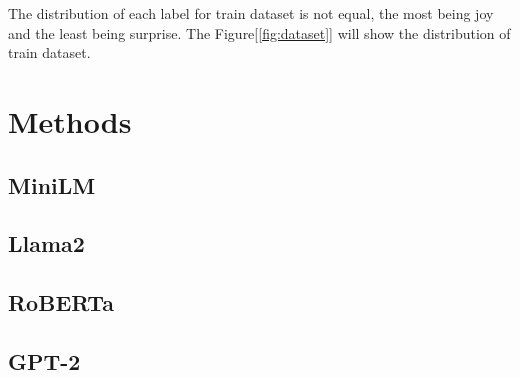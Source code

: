 The distribution of each label for train dataset is not equal, the most being joy and the least being surprise. The Figure[\ref{fig:dataset}] will show the distribution of train dataset. 

\section{Methods}

\subsection{MiniLM}



\subsection{Llama2}
  
\subsection{RoBERTa}

\subsection{GPT-2}


